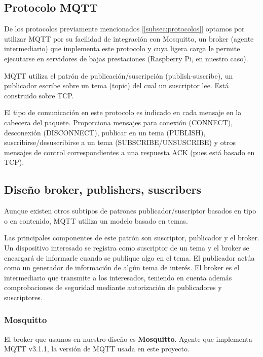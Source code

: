 \documentclass[a4paper,10pt]{article}
\begin{document}
\subsection{Protocolo MQTT}\label{protocolo-mqtt}

De los protocolos previamente mencionados [\ref{subsec:protocolos}]
optamos por utilizar MQTT por su facilidad de integración con
Mosquitto, un broker (agente intermediario) que implementa este
protocolo y cuya ligera carga le permite ejecutarse en servidores de
bajas prestaciones (Raspberry Pi, en nuestro caso).

MQTT utiliza el patrón de publicación/suscripción (publish-suscribe),
un publicador escribe sobre un tema (topic) del cual un suscriptor
lee. Está construido sobre TCP.

El tipo de comunicación en este protocolo es indicado en cada mensaje
en la cabecera del paquete. Proporciona mensajes para conexión
(CONNECT), desconexión (DISCONNECT), publicar en un tema (PUBLISH),
suscribirse/desuscribirse a un tema (SUBSCRIBE/UNSUSCRIBE) y otros
mensajes de control correspondientes a una respuesta ACK (pues está
basado en TCP)\cite{banksMQTTVersionEdited}.

\subsection{Diseño broker, publishers,
suscribers}\label{diseuxf1o-broker-publishers-suscribers}

Aunque existen otros subtipos de patrones publicador/suscriptor
basados en tipo o en contenido\cite{p.th.eugsterManyFacesPublish},
MQTT utiliza un modelo basado en temas.

Las principales componentes de este patrón son suscriptor, publicador
y el broker. Un dispositivo interesado se registra como suscriptor de
un tema y el broker se encargará de informarle cuando se publique algo
en el tema. El publicador actúa como un generador de información de
algún tema de interés. El broker es el intermediario que transmite a
los interesados, teniendo en cuenta además comprobaciones de seguridad
mediante autorización de publicadores y
suscriptores.\cite{al-fuqahaInternetThingsSurvey2015,hunkelerMQTTSPublishSubscribe2008}

\subsubsection{Mosquitto}\label{subsubsec:broker_mosquitto}

El broker que usamos en nuestro diseño es
\textbf{Mosquitto}\cite{EclipseMosquitto}. Agente que implementa MQTT
v3.1.1, la versión de MQTT usada en este proyecto.
\end{document}
